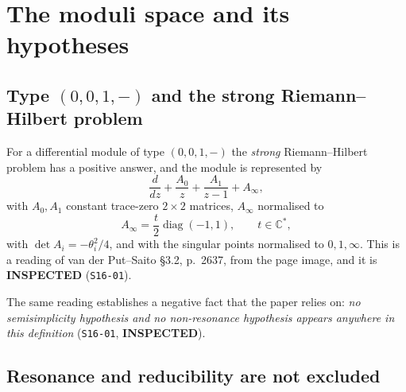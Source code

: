 %

\section{The moduli space and its hypotheses}\label{sec:moduli}

\subsection{Type \texorpdfstring{$(0,0,1,-)$}{(0,0,1,-)} and the strong
Riemann--Hilbert problem}\label{ssec:type001}

For a differential module of type $(0,0,1,-)$ the \emph{strong} Riemann--Hilbert
problem has a positive answer, and the module is represented by
\begin{equation}\label{eq:module}
  \frac{d}{dz}+\frac{A_0}{z}+\frac{A_1}{z-1}+A_\infty ,
\end{equation}
with $A_0,A_1$ constant trace-zero $2\times2$ matrices, $A_\infty$ normalised
to
\begin{equation}\label{eq:Ainf}
  A_\infty=\frac{t}{2}\operatorname{diag}(-1,1),\qquad t\in\mathbb C^{*},
\end{equation}
with $\det A_i=-\theta_i^2/4$, and with the singular points normalised to
$0,1,\infty$. This is a reading of van der Put--Saito \S3.2, p.~2637, from the
page image, and it is \textbf{INSPECTED} (\texttt{S16-01}).

The same reading establishes a negative fact that the paper relies on:
\emph{no semisimplicity hypothesis and no non-resonance hypothesis appears
anywhere in this definition} (\texttt{S16-01}, \textbf{INSPECTED}).

\subsection{Resonance and reducibility are not excluded}\label{ssec:resonance}

